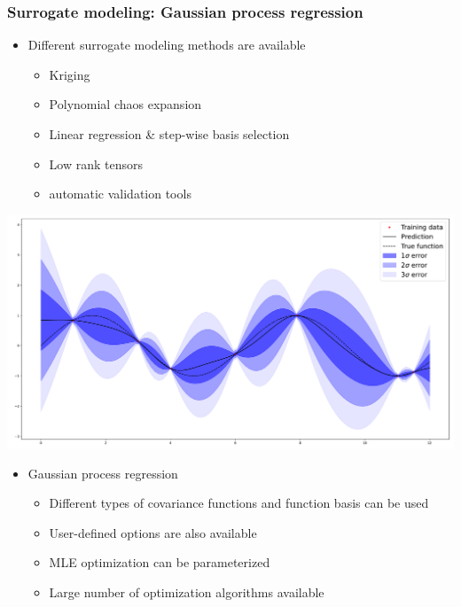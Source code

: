 \documentclass[aspectratio=169]{beamer}
\begin{document}




\begin{frame}[containsverbatim]
\frametitle{Surrogate modeling: Gaussian process regression}

\begin{minipage}[t]{0.5\textwidth}
    
\small 
\begin{itemize}
\item Different surrogate modeling methods are available
\begin{itemize}
\tiny
\item Kriging
\item Polynomial chaos expansion
\item Linear regression \& step-wise basis selection
\item Low rank tensors
\item automatic validation tools
\end{itemize}
\end{itemize}



    
\centering
    \includegraphics[width=.9\textwidth]{figures/Kriging.pdf}
    
\end{minipage}%
\begin{minipage}[t]{0.5\textwidth}
    
\small
\begin{itemize}
\item Gaussian process regression
\begin{itemize}
\tiny
\item Different types of covariance functions and function basis can be used
\item User-defined options are also available
\item MLE optimization can be parameterized
\item Large number of optimization algorithms available
\end{itemize}
\end{itemize}



\end{minipage}
\end{frame}
\end{document}
